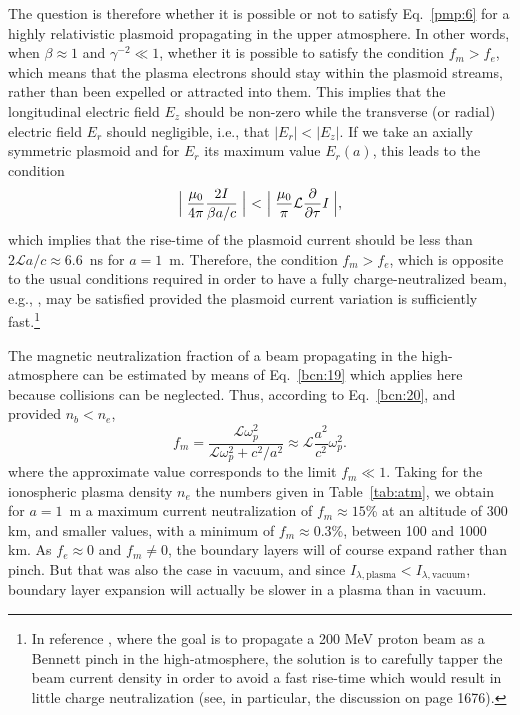 \documentclass [12pt,a4paper,     ]{report} %
\begin{document}
   The question is therefore whether it is possible or not to satisfy Eq.~\eqref{pmp:6} for a highly relativistic plasmoid propagating in the upper atmosphere.  In other words, when $\beta\approx 1$ and $\gamma^{-2} \ll 1$, whether it is possible to satisfy the condition $f_m > f_e$, which means that the plasma electrons should stay within the plasmoid streams, rather than been expelled or attracted into them.  This implies that the longitudinal electric field $E_z$ should be non-zero while the transverse (or radial) electric field $E_r$ should negligible, i.e., that $|E_r| < |E_z|$.  If we take an axially symmetric plasmoid and for $E_r$ its maximum value $E_r(a)$,  this leads to the condition
%
\begin{equation}\label{pmp:8}
   \Bigm| \frac{\mu_0}{4\pi} \frac{2I}{\beta a/c} \Bigm| ~ < ~
   \Bigm| \frac{\mu_0}{\pi} \mathcal{L} \frac{\partial}{\partial \tau} I \Bigm|,
\end{equation}
%
which implies that the rise-time of the plasmoid current should be less than $2 \mathcal{L} a/c \approx 6.6$~ns for $a=1$~m.  Therefore, the condition $f_m > f_e$, which is opposite to the usual conditions required in order to have a fully charge-neutralized beam, e.g., \cite[p.1998]{MCART1973-}, may be satisfied provided the plasmoid current variation is sufficiently fast.\footnote{In reference \cite{CHRIE1986-}, where the goal is to propagate a 200 MeV proton beam as a Bennett pinch in the high-atmosphere, the solution is to carefully tapper the beam current density in order to avoid a fast rise-time which would result in little charge neutralization (see, in particular, the discussion on page 1676).}

   The magnetic neutralization fraction of a beam propagating in the high-atmosphere can be estimated by means of Eq.~\eqref{bcn:19} which applies 
here because collisions can be neglected. Thus, according to Eq.~\eqref{bcn:20}, and provided $n_b < n_e$,
%
\begin{equation}\label{pmp:9} %
               f_m =  \frac{\mathcal{L}\omega_p^2}
                           {\mathcal{L}\omega_p^2 + c^2/a^2}
                   \approx \mathcal{L}\frac{a^2}{c^2} \omega_p^2.
\end{equation}
%
where the approximate value corresponds to the limit $f_m \ll 1$.  Taking for the ionospheric plasma density $n_e$ the numbers given in Table~\ref{tab:atm}, we obtain for $a=1$~m a maximum current neutralization of $f_m \approx 15$\% at an altitude of 300 km, and smaller values, with a minimum of $f_m \approx 0.3$\%, between 100 and 1000 km.  As $f_e \approx 0$ and $f_m \neq 0$, the boundary layers will of course expand rather than pinch.  But that was also the case in vacuum, and since $I_{\lambda,\text{plasma}} < I_{\lambda,\text{vacuum}}$, boundary layer expansion will actually be slower in a plasma than in vacuum.
\end{document}
